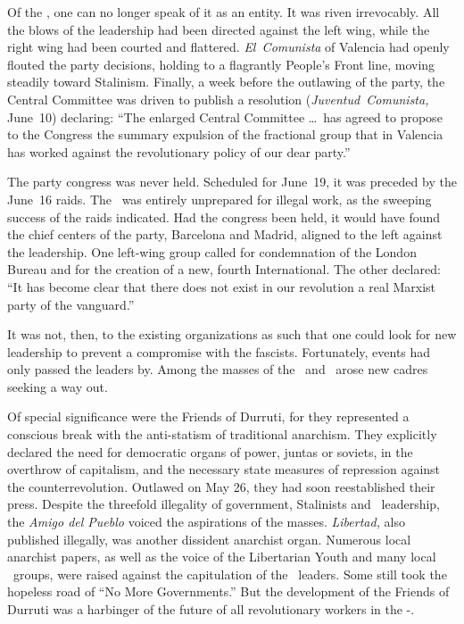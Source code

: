 Of the \POUM\kn, one can no longer speak of it as an entity. It was riv\-en irrevocably. All the blows of the leadership had been directed against the left wing, while the right wing had been courted and flattered. \emph{El~Comunista} of Valencia had openly flouted the party decisions, holding to a flagrantly People’s Front line, moving steadily toward Stalinism. Finally\kn, a week before the outlawing of the party, the Central Committee was driven to publish a resolution (\emph{Juventud~Comunista,} June~10) declaring: ``The enlarged Central Committee \dots\ has agreed to propose to the Congress the summary expulsion of the fractional group that in Valencia has worked against the revolutionary policy of our dear party.\kn\kn''

The party congress was never held. Scheduled for June~19, it was preceded by the June~16 raids. The \POUM\ was entirely unprepared for illegal work, as the sweeping success of the raids indicated. Had the congress been held, it would have found the chief centers of the party, Barcelona and Madrid, aligned to the left against the leadership. One left-wing group called for condemnation of the London Bureau and for the creation of a new, fourth International. The other declared: ``It has become clear that there does not exist in our revolution a real Marxist party of the vanguard.\kn\kn''

It was not, then, to the existing organizations as such that one could look for new leadership to prevent a compromise with the fascists. Fortunately, events had only passed the leaders by. Among the masses of the \CNT\ and \UGT\ arose new cadres seeking a way out.

Of special significance were the Friends of Durruti, for they represented a conscious break with the anti-statism of traditional anarchism. They explicitly declared the need for democratic organs of power, juntas or soviets, in the overthrow of capitalism, and the necessary state measures of repression against the counterrevolution. Outlawed on May 26, they had soon reestablished their press. Despite the threefold illegality of government, Stalinists and \CNT\ leadership, the \emph{Amigo del Pueblo} voiced the aspirations of the masses. \emph{Libertad,} also published illegally\kn, was another dissident anarchist organ. Numerous local anarchist papers, as well as the voice of the Libertarian Youth and many local \FAI\ groups, were raised against the capitulation of the \CNT\ leaders. Some still took the hopeless road of ``No More Governments.\kn\kn'' But the development of the Friends of Durruti was a harbinger of the future of all revolutionary workers in the \CNT-\FAI.

